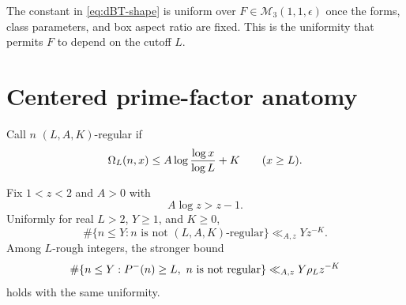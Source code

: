 \documentclass[11pt]{article}
\begin{document}
The constant in \eqref{eq:dBT-shape} is uniform over
\(F\in\mathcal M_3(1,1,\epsilon)\) once the forms, class parameters, and box
aspect ratio are fixed. This is the uniformity that permits \(F\) to depend
on the cutoff \(L\).

\section{Centered prime-factor anatomy}\label{sec:tail}

Call \(n\) \((L,A,K)\)-regular if
\begin{equation}\label{eq:regular}
 \Omega_L(n,x)\leq
 A\log\frac{\log x}{\log L}+K
 \qquad(x\geq L).
\end{equation}

\begin{lemma}\label{lem:centered-tail}
Fix \(1<z<2\) and \(A>0\) with
\[
 A\log z>z-1.
\]
Uniformly for real \(L>2\), \(Y\geq1\), and \(K\geq0\),
\[
 \#\{n\leq Y:n\text{ is not \((L,A,K)\)-regular}\}
 \ll_{A,z}Yz^{-K}.
\]
Among \(L\)-rough integers, the stronger bound
\[
 \#\{n\leq Y:P^-(n)\geq L,\
 n\text{ is not regular}\}
 \ll_{A,z}Y\rho_L z^{-K}
\]
holds with the same uniformity.
\end{lemma}
\end{document}
